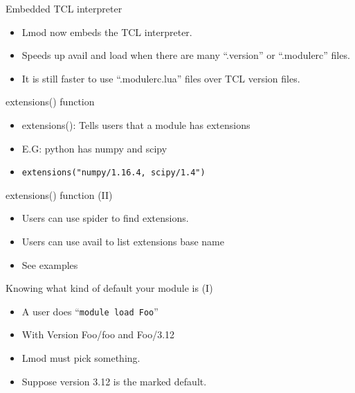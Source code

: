 \documentclass{beamer}
\begin{document}
\begin{frame}{Embedded TCL interpreter}
  \begin{itemize}
    \item Lmod now embeds the TCL interpreter.
    \item Speeds up avail and load when there are many ``.version'' or
      ``.modulerc'' files.
    \item It is still faster to use ``.modulerc.lua'' files over TCL
      version files.
  \end{itemize}
\end{frame}


\begin{frame}{extensions() function}
  \begin{itemize}
    \item extensions(): Tells users that a module has extensions
    \item E.G: python has numpy and scipy
    \item \texttt{extensions("numpy/1.16.4, scipy/1.4")}
  \end{itemize}
\end{frame}

\begin{frame}{extensions() function (II)}
  \begin{itemize}
    \item Users can use spider to find extensions.
    \item Users can use avail to list extensions base name
    \item See examples
  \end{itemize}
\end{frame}

\begin{frame}{Knowing what kind of default your module is (I)}
  \begin{itemize}
    \item A user does ``\texttt{module load Foo}''
    \item With Version Foo/foo and Foo/3.12
    \item Lmod must pick something.  
    \item Suppose version 3.12 is the marked default.
  \end{itemize}
\end{frame}
\end{document}
